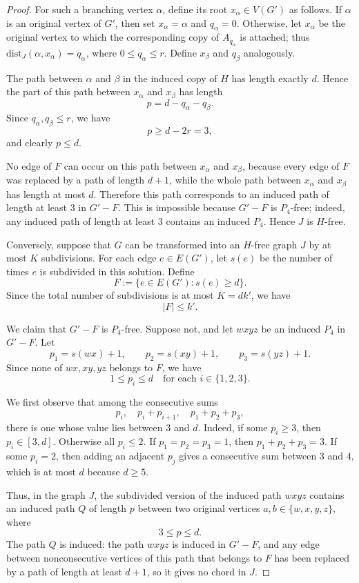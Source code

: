 \documentclass[10pt,a4paper]{amsart}
\newcommand{\dist}{\mathrm{dist}}
\begin{document}
\begin{proof}
For such a branching vertex $\alpha$, define its root $x_\alpha\in V(G')$ as
follows.  If $\alpha$ is an original vertex of $G'$, then set
$x_\alpha=\alpha$ and $q_\alpha=0$.  Otherwise, let $x_\alpha$ be the original
vertex to which the corresponding copy of $A_{q_\alpha}$ is attached; thus
$\dist_J(\alpha,x_\alpha)=q_\alpha$, where $0\leq q_\alpha\leq r$.
Define $x_\beta$ and $q_\beta$ analogously.

The path between $\alpha$ and $\beta$ in the induced copy of $H$ has length
exactly $d$.  Hence the part of this path between $x_\alpha$ and $x_\beta$ has
length
\[
    p=d-q_\alpha-q_\beta .
\]
Since $q_\alpha,q_\beta\leq r$, we have
\[
    p\geq d-2r=3,
\]
and clearly $p\leq d$.

No edge of $F$ can occur on this path between $x_\alpha$ and $x_\beta$, because
every edge of $F$ was replaced by a path of length $d+1$, while the whole path
between $x_\alpha$ and $x_\beta$ has length at most $d$.  Therefore this path
corresponds to an induced path of length at least $3$ in $G'-F$.  This is
impossible because $G'-F$ is $P_4$-free; indeed, any induced path of length at
least $3$ contains an induced $P_4$.  Hence $J$ is $H$-free.

Conversely, suppose that $G$ can be transformed into an $H$-free graph $J$ by
at most $K$ subdivisions.  For each edge $e\in E(G')$, let $s(e)$ be the number
of times $e$ is subdivided in this solution.  Define
\[
    F:=\{e\in E(G') : s(e)\geq d\}.
\]
Since the total number of subdivisions is at most $K=dk'$, we have
\[
    |F|\leq k'.
\]

We claim that $G'-F$ is $P_4$-free.  Suppose not, and let $wxyz$ be an induced
$P_4$ in $G'-F$.  Let
\[
    p_1=s(wx)+1,\qquad p_2=s(xy)+1,\qquad p_3=s(yz)+1.
\]
Since none of $wx,xy,yz$ belongs to $F$, we have
\[
    1\leq p_i\leq d
    \quad\text{for each }i\in\{1,2,3\}.
\]

We first observe that among the consecutive sums
\[
    p_i,\quad p_i+p_{i+1},\quad p_1+p_2+p_3,
\]
there is one whose value lies between $3$ and $d$.  Indeed, if some
$p_i\geq 3$, then $p_i\in[3,d]$.  Otherwise all $p_i\leq 2$.  If
$p_1=p_2=p_3=1$, then $p_1+p_2+p_3=3$.  If some $p_i=2$, then adding an
adjacent $p_j$ gives a consecutive sum between $3$ and $4$, which is at most
$d$ because $d\geq 5$.

Thus, in the graph $J$, the subdivided version of the induced path $wxyz$
contains an induced path $Q$ of length $p$ between two original vertices
$a,b\in\{w,x,y,z\}$, where
\[
    3\leq p\leq d.
\]
The path $Q$ is induced: the path $wxyz$ is induced in $G'-F$, and any edge
between nonconsecutive vertices of this path that belongs to $F$ has been
replaced by a path of length at least $d+1$, so it gives no chord in $J$.


\end{proof}
\end{document}
